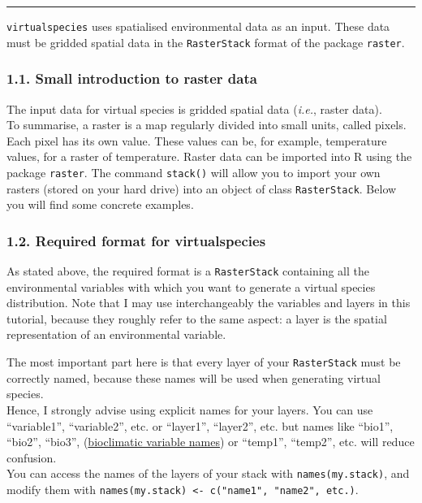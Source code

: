 \documentclass[]{article}
\begin{document}
\begin{center}\rule{0.5\linewidth}{\linethickness}\end{center}

\setcounter{section}{1} \setcounter{figure}{0}

\texttt{virtualspecies} uses spatialised environmental data as an input.
These data must be gridded spatial data in the \texttt{RasterStack}
format of the package \texttt{raster}.

\subsubsection{1.1. Small introduction to raster
data}\label{small-introduction-to-raster-data}

The input data for virtual species is gridded spatial data (\emph{i.e.},
raster data).\\
To summarise, a raster is a map regularly divided into small units,
called pixels. Each pixel has its own value. These values can be, for
example, temperature values, for a raster of temperature. Raster data
can be imported into R using the package \texttt{raster}. The command
\texttt{stack()} will allow you to import your own rasters (stored on
your hard drive) into an object of class \texttt{RasterStack}. Below you
will find some concrete examples.

\subsubsection{1.2. Required format for
virtualspecies}\label{required-format-for-virtualspecies}

As stated above, the required format is a \texttt{RasterStack}
containing all the environmental variables with which you want to
generate a virtual species distribution. Note that I may use
interchangeably the variables and layers in this tutorial, because they
roughly refer to the same aspect: a layer is the spatial representation
of an environmental variable.

The most important part here is that every layer of your
\texttt{RasterStack} must be correctly named, because these names will
be used when generating virtual species.\\
Hence, I strongly advise using explicit names for your layers. You can
use ``variable1'', ``variable2'', etc. or ``layer1'', ``layer2'', etc.
but names like ``bio1'', ``bio2'', ``bio3'',
(\href{http://worldclim.org/bioclim}{bioclimatic variable names}) or
``temp1'', ``temp2'', etc. will reduce confusion.\\
You can access the names of the layers of your stack with
\texttt{names(my.stack)}, and modify them with
\texttt{names(my.stack)\ \textless{}-\ c("name1",\ "name2",\ etc.)}.
\end{document}
